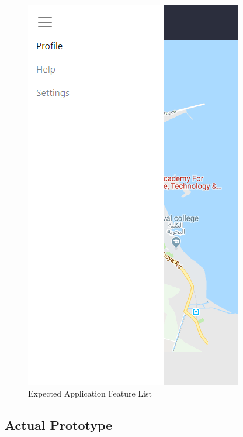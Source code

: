 \documentclass{scrreprt}
\begin{document}
  \begin{figure}[ht!]
  \qquad\qquad\qquad\qquad
  \centering\includegraphics[height=0.3\textheight]{AppDesign/expectedDesign/3.png}\newline
  \caption[Expected Application Feature List]{Expected Application Feature List}%
  \end{figure}
  \newpage
  
\subsection{Actual Prototype}
\end{document}
